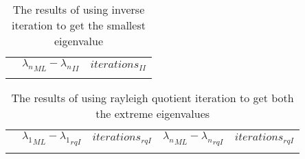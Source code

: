 \documentclass[a4paper,11pt]{article}
\begin{document}
\newcommand{\iimacro}[1] {
  \ensuremath{n=#1} & 
                    & 
                    \\ \cline{2-3}
}
\begin{table}[h]
  \begin{tabular}{r|c|c|}
    \multicolumn{1}{r}{}
     & \multicolumn{1}{c}{${\lambda_n}_{ML}-{\lambda_n}_{II}$}
     & \multicolumn{1}{c}{$iterations_{II}$}\\
    \cline{2-3}
    \foralln{\iimacro}
  \end{tabular}
  \caption{The results of using inverse iteration to get the smallest eigenvalue}
  \label{tab:inverit}
\end{table}

\newcommand{\rqimacro}[1] {
  \ensuremath{n=#1} & 
                    & 
                    & 
                    & 
                    \\ \cline{2-5}
}
\begin{table}[h]
  \begin{tabular}{r|c|c|c|c|}
    \multicolumn{1}{r}{}
     & \multicolumn{1}{c}{${\lambda_1}_{ML}-{\lambda_1}_{rqI}$}
     & \multicolumn{1}{c}{$iterations_{rqI}$}
     & \multicolumn{1}{c}{${\lambda_n}_{ML}-{\lambda_n}_{rqI}$}
     & \multicolumn{1}{c}{$iterations_{rqI}$}\\
    \cline{2-5}
    \foralln{\rqimacro}
  \end{tabular}
  \caption{The results of using rayleigh quotient iteration to get both the
  extreme eigenvalues}
  \label{tab:rqit}
\end{table}
\end{document}
